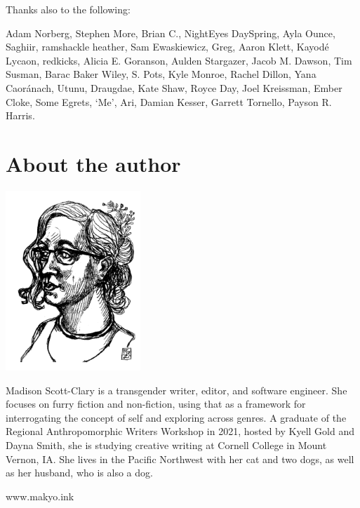 Thanks also to the following:

Adam Norberg, Stephen More, Brian C., NightEyes DaySpring, Ayla Ounce, Saghiir, ramshackle heather, Sam Ewaskiewicz, Greg, Aaron Klett, Kayodé Lycaon, redkicks, Alicia E. Goranson, Aulden Stargazer, Jacob M. Dawson, Tim Susman, Barac Baker Wiley, S. Pots, Kyle Monroe, Rachel Dillon, Yana Caoránach, Utunu, Draugdae, Kate Shaw, Royce Day, Joel Kreissman, Ember Cloke, Some Egrets, `Me', Ari, Damian Kesser, Garrett Tornello, Payson R. Harris.

\chapter*{About the author}

\begin{center}
  \includegraphics[width=2in]{content/headshot.png}
\end{center}

\noindent Madison Scott-Clary is a transgender writer, editor, and software engineer. She focuses on furry fiction and non-fiction, using that as a framework for interrogating the concept of self and exploring across genres. A graduate of the Regional Anthropomorphic Writers Workshop in 2021, hosted by Kyell Gold and Dayna Smith, she is studying creative writing at Cornell College in Mount Vernon, IA. She lives in the Pacific Northwest with her cat and two dogs, as well as her husband, who is also a dog.

\begin{center}
    www.makyo.ink
\end{center}

\vfill
